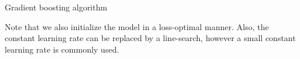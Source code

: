 
\begin{vbframe}{Gradient boosting algorithm}



Note that we also initialize the model in a loss-optimal manner. Also, the constant learning rate can be replaced by a line-search, however a small constant learning rate is commonly used.

\end{vbframe}


\endlecture


